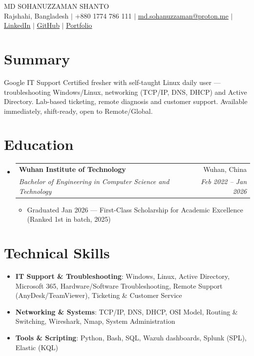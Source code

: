 \documentclass[letterpaper,11pt]{article}
\makeatletter
\newcommand{\resumeItem}[1]{
  \item\small{#1}
}
\newcommand{\resumeSubheading}[4]{
  \vspace{-2pt}\item
    \begin{tabular*}{0.97\textwidth}[t]{l@{\extracolsep{\fill}}r}
      \textbf{#1} & #2 \\
      \textit{\small#3} & \textit{\small #4} \\
    \end{tabular*}\vspace{-7pt}
}
\newcommand{\resumeSubHeadingListStart}{\begin{itemize}[leftmargin=0.15in, label={}]}
\newcommand{\resumeSubHeadingListEnd}{\end{itemize}}
\newcommand{\resumeItemListStart}{\begin{itemize}}
\newcommand{\resumeItemListEnd}{\end{itemize}\vspace{-5pt}}
\makeatother
\begin{document}
\begin{center}
    {\Huge \textsc{MD SOHANUZZAMAN SHANTO}} \\
    \vspace{6pt}
    {\small Rajshahi, Bangladesh $|$ +880 1774 786 111 $|$ \href{mailto:md.sohanuzzaman@proton.me}{\underline{md.sohanuzzaman@proton.me}} $|$ \href{https://linkedin.com/in/sohanuzzaman3301}{\underline{LinkedIn}} $|$ \href{https://github.com/sohanuzzaman3301}{\underline{GitHub}} $|$ \href{https://sohanuzzaman3301.github.io}{\underline{Portfolio}}}
\end{center}

\section{Summary}
\begin{itemize}[leftmargin=0.15in, label={}]
  \small{\item{Google IT Support Certified fresher with self-taught Linux daily user — troubleshooting Windows/Linux, networking (TCP/IP, DNS, DHCP) and Active Directory. Lab-based ticketing, remote diagnosis and customer support. Available immediately, shift-ready, open to Remote/Global.}}
\end{itemize}

\section{Education}
\resumeSubHeadingListStart%
\resumeSubheading%
{Wuhan Institute of Technology}{Wuhan, China}
{Bachelor of Engineering in Computer Science and Technology}{Feb 2022 -- Jan 2026}
\resumeItemListStart%
\resumeItem{Graduated Jan 2026 — First-Class Scholarship for Academic Excellence (Ranked 1st in batch, 2025)}
\resumeItemListEnd%
\resumeSubHeadingListEnd%

\section{Technical Skills}
\begin{itemize}[leftmargin=0.15in, label={}]
\small
\item{\textbf{IT Support \& Troubleshooting}: Windows, Linux, Active Directory, Microsoft 365, Hardware/Software Troubleshooting, Remote Support (AnyDesk/TeamViewer), Ticketing \& Customer Service}
\item{\textbf{Networking \& Systems}: TCP/IP, DNS, DHCP, OSI Model, Routing \& Switching, Wireshark, Nmap, System Administration}
\item{\textbf{Tools \& Scripting}: Python, Bash, SQL, Wazuh dashboards, Splunk (SPL), Elastic (KQL)}
\end{itemize}
\end{document}
